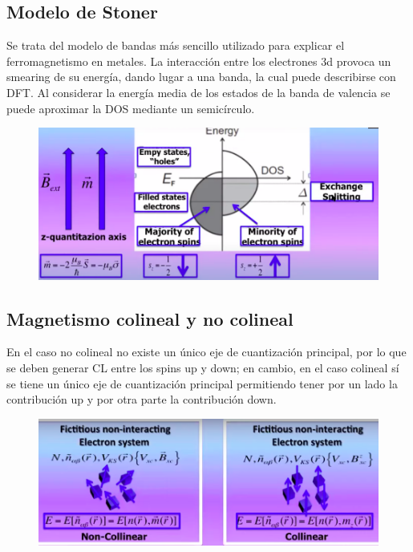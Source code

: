 \subsection{Modelo de Stoner}

  Se trata del modelo de bandas más sencillo utilizado para explicar el ferromagnetismo en metales. La interacción entre los electrones 3d provoca un smearing de su energía, dando lugar a una banda, la cual puede describirse con DFT. Al considerar la energía media de los estados de la banda de valencia se puede aproximar la DOS mediante un semicírculo.

    \begin{figure}[H]
        \centering
        \includegraphics[scale = 0.5]{figs/D7/stoner.png}
    \end{figure}

\subsection{Magnetismo colineal y no colineal}

  En el caso no colineal no existe un único eje de cuantización principal, por lo que se deben generar CL entre los spins up y down; en cambio, en el caso colineal sí se tiene un único eje de cuantización principal permitiendo tener por un lado la contribución up y por otra parte la contribución down.

  \begin{figure}[H]
      \centering
      \includegraphics[scale = 0.5]{figs/D7/colin.png}
  \end{figure}

